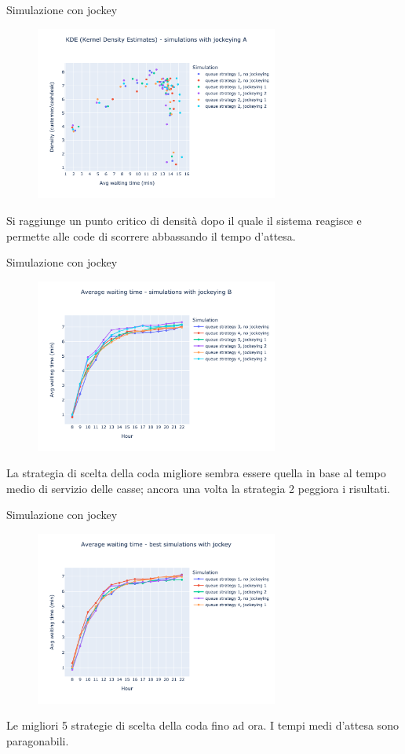 \begin{frame}{Simulazione con jockey}
	\begin{figure}[H]
		\centering
		\includegraphics[width=8cm]{"../report/images/results/kde_jockey_a.png"}
	\end{figure}
	Si raggiunge un punto critico di densità dopo il quale il sistema reagisce e permette alle code di scorrere abbassando il tempo d'attesa.
\end{frame}

\begin{frame}{Simulazione con jockey}
	\begin{figure}[H]
		\centering
		\includegraphics[width=8cm]{"../report/images/results/avg_wt_jockey_b.png"}
	\end{figure}
	La strategia di scelta della coda migliore sembra essere quella in base al tempo medio di servizio delle casse; ancora una volta la strategia 2 peggiora i risultati.
\end{frame}

\begin{frame}{Simulazione con jockey}
	\begin{figure}[H]
		\centering
		\includegraphics[width=8cm]{"../report/images/results/avg_wt_jockey_best.png"}
	\end{figure}
	Le migliori 5 strategie di scelta della coda fino ad ora. I tempi medi d'attesa sono paragonabili.
\end{frame}

